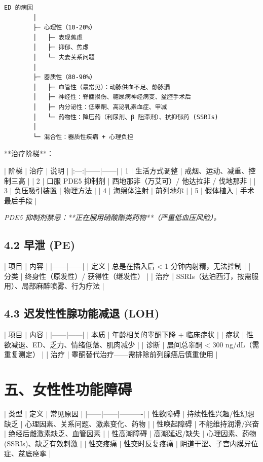 \documentclass[12pt,UTF8,openany]{ctexbook}
\begin{document}
\begin{verbatim}
ED 的病因
        │
        ├─ 心理性（10-20%）
        │   ├─ 表现焦虑
        │   ├─ 抑郁、焦虑
        │   └─ 夫妻关系问题
        │
        ├─ 器质性（80-90%）
        │   ├─ 血管性（最常见）：动脉供血不足、静脉漏
        │   ├─ 神经性：脊髓损伤、糖尿病神经病变、盆腔手术后
        │   ├─ 内分泌性：低睾酮、高泌乳素血症、甲减
        │   └─ 药物性：降压药（利尿剂、β 阻滞剂）、抗抑郁药 (SSRIs)
        │
        └─ 混合性：器质性疾病 + 心理负担
\end{verbatim}

**治疗阶梯**：

| 阶梯 | 治疗 | 说明 |
|:---:|------|------|
| 1 | 生活方式调整 | 戒烟、运动、减重、控制三高 |
| 2 | 口服 PDE5 抑制剂 | 西地那非（万艾可）/ 他达拉非 / 伐地那非 |
| 3 | 负压吸引装置 | 物理方法 |
| 4 | 海绵体注射 | 前列地尔 |
| 5 | 假体植入 | 手术最后手段 |

\emph{PDE5 抑制剂禁忌：**正在服用硝酸酯类药物**（严重低血压风险）。}

\subsection{4.2 早泄 (PE)}

| 项目 | 内容 |
|------|------|
| 定义 | 总是在插入后 < 1 分钟内射精，无法控制 |
| 分类 | 终身性（原发性）/ 获得性（继发性） |
| 治疗 | SSRIs（达泊西汀，按需服用）、局部麻醉喷雾、行为疗法 |

\subsection{4.3 迟发性性腺功能减退 (LOH)}

| 项目 | 内容 |
|------|------|
| 本质 | 年龄相关的睾酮下降 + 临床症状 |
| 症状 | 性欲减退、ED、乏力、情绪低落、肌肉减少 |
| 诊断 | 晨间总睾酮 < 300 ng/dL（需重复测定） |
| 治疗 | 睾酮替代治疗——需排除前列腺癌后慎重使用 |

\hrulefill

\section{五、女性性功能障碍}

| 类型 | 定义 | 常见原因 |
|------|------|----------|
| 性欲障碍 | 持续性性兴趣/性幻想缺乏 | 心理因素、关系问题、激素变化、药物 |
| 性唤起障碍 | 不能维持润滑/兴奋 | 绝经后雌激素缺乏、血管因素 |
| 性高潮障碍 | 高潮延迟/缺失 | 心理因素、药物 (SSRIs)、缺乏有效刺激 |
| 性交疼痛 | 性交时反复疼痛 | 阴道干涩、子宫内膜异位症、盆底痉挛 |
\end{document}
